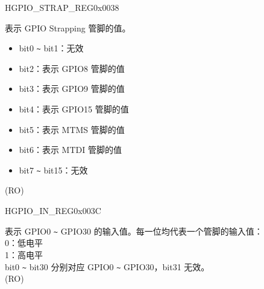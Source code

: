 \begin{register}{H}{GPIO\_STRAP\_REG}{0x0038}\label{regdesc:GPIOSTRAPREG}
%
%
\regnewline%
\begin{regdesc}\begin{reglist}
\label{fielddesc:GPIOSTRAPPING}\item [GPIO\_STRAPPING] 表示 GPIO Strapping 管脚的值。 
\begin{itemize}
    \item bit0 \verb+~+ bit1：无效
    \item bit2：表示 GPIO8 管脚的值
    \item bit3：表示 GPIO9 管脚的值
    \item bit4：表示 GPIO15 管脚的值
    \item bit5：表示 MTMS 管脚的值
    \item bit6：表示 MTDI 管脚的值
    \item bit7 \verb+~+ bit15：无效
\end{itemize}
(RO)
\end{reglist}\end{regdesc}
\end{register}


\begin{register}{H}{GPIO\_IN\_REG}{0x003C}\label{regdesc:GPIOINREG}
%
\regnewline%
\begin{regdesc}\begin{reglist}
\label{fielddesc:GPIOINDATANEXT}\item [GPIO\_IN\_DATA\_NEXT] 表示 GPIO0 \verb+~+ GPIO30 的输入值。每一位均代表一个管脚的输入值：\\
0：低电平 \\
1：高电平 \\
bit0 \verb+~+ bit30 分别对应 GPIO0 \verb+~+ GPIO30，bit31 无效。\\
(RO)
\end{reglist}\end{regdesc}
\end{register}

